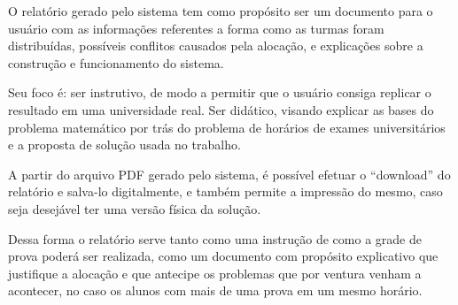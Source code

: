 O relatório gerado pelo sistema tem como propósito ser um documento para o usuário com as informações referentes a forma como as turmas foram distribuídas, possíveis conflitos causados pela alocação, e explicações sobre a construção e funcionamento do sistema.

Seu foco é: ser instrutivo, de modo a permitir que o usuário consiga replicar o resultado em uma universidade real. Ser didático, visando explicar as bases do problema matemático por trás do problema de horários de exames universitários e a proposta de solução usada no trabalho.

A partir do arquivo PDF gerado pelo sistema, é possível efetuar o “download” do relatório e salva-lo digitalmente, e também permite a impressão do mesmo, caso seja desejável ter uma versão física da solução.

Dessa forma o relatório serve tanto como uma instrução de como a grade de prova poderá ser realizada, como um documento com propósito explicativo que justifique a alocação e que antecipe os problemas que por ventura venham a acontecer, no caso os alunos com mais de uma prova em um mesmo horário.